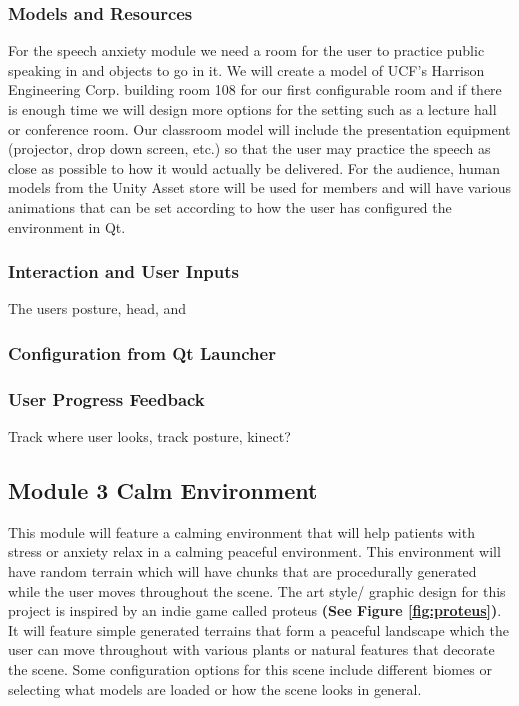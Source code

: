 \documentclass[a4paper,10pt]{article}
\begin{document}
\subsubsection{Models and Resources}
For the speech anxiety module we need a room for the user to practice public speaking in and objects to go in it. We will create a model of UCF's Harrison Engineering Corp. building room 108 for our first configurable room and if there is enough time we will design more options for the setting such as a lecture hall or conference room. Our classroom model will include the presentation equipment (projector, drop down screen, etc.) so that the user may practice the speech as close as possible to how it would actually be delivered. For the audience, human models from the Unity Asset store will be used for members and will have various animations that can be set according to how the user has configured the environment in Qt.

\subsubsection{Interaction and User Inputs}
The users posture, head, and 

\subsubsection{Configuration from Qt Launcher}

\subsubsection{User Progress Feedback}
Track where user looks, track posture, kinect?
\pagebreak
\subsection{Module 3 Calm Environment} %
This module will feature a calming environment that will help patients with stress or anxiety relax in a calming peaceful environment. This environment will have random terrain which will have chunks 
that are procedurally generated while the user moves throughout the scene.  The art style/ graphic design for this project is inspired by an indie game called proteus \textbf{(See Figure \ref{fig:proteus})}. 
It will feature simple generated terrains that form a  peaceful landscape which the user can move throughout with various plants or natural features that decorate the scene. 
Some configuration options for this scene include different biomes or selecting what models are loaded or how the scene looks in general. 
\end{document}
